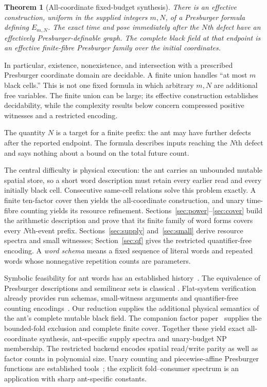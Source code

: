 \documentclass[11pt]{article}
\newtheorem{theorem}{Theorem}[section]
\theoremstyle{remark}\newtheorem{remark}[theorem]{Remark}
\begin{document}
\begin{theorem}[All-coordinate fixed-budget synthesis]\label{thm:main}
There is an effective construction, uniform in the supplied integers $m,N$,
of a Presburger formula defining $E_{m,N}$. The exact time and pose immediately
after the $N$th defect have an effectively Presburger-definable graph. The
complete black field at that endpoint is an effective finite-fibre Presburger
family over the initial coordinates.
\end{theorem}

In particular, existence, nonexistence, and intersection with a prescribed
Presburger coordinate domain are decidable. A finite union handles ``at most
$m$ black cells.'' This is not one fixed formula in which arbitrary $m,N$ are
additional free variables. The finite union can be large; its effective construction establishes
decidability, while the complexity results below concern compressed positive
witnesses and a restricted encoding.

The quantity $N$ is a target for a finite prefix: the ant may have further
defects after the reported endpoint. The formula describes inputs reaching
the $N$th defect and says nothing about a bound on the total future count.

The central difficulty is physical execution: the ant carries an unbounded
mutable spatial store, so a short word description must retain every earlier
read and every initially black cell. Consecutive same-cell relations solve
this problem exactly. A finite ten-factor cover then yields the all-coordinate
construction, and unary time-fibre counting yields its resource refinement.
Sections~\ref{sec:power}--\ref{sec:cover} build the arithmetic description
and prove that its finite family of word forms covers every $N$th-event
prefix. Sections~\ref{sec:supply} and~\ref{sec:small} derive resource spectra
and small witnesses; Section~\ref{sec:qf} gives the restricted quantifier-free
encoding. A \emph{word schema} means a fixed sequence of literal words and
repeated words whose nonnegative repetition counts are parameters.

Symbolic feasibility for ant words has an established history~\cite{gajardo}.
The equivalence of Presburger descriptions and semilinear sets is classical
\cite{ginsburg}. Flat-system verification already provides run schemas,
small-witness arguments and quantifier-free counting encodings~\cite{flat,demri}.
Our reduction supplies the additional physical semantics of the ant's complete
mutable black field. The companion factor paper~\cite{project} supplies the
bounded-fold exclusion and complete finite cover. Together these yield exact
all-coordinate synthesis, ant-specific supply spectra and unary-budget NP
membership. The restricted backend encodes spatial read/write parity as well
as factor counts in polynomial size. Unary counting and piecewise-affine
Presburger functions are established tools~\cite{counting,cluckers}; the
explicit fold--consumer spectrum is an application with sharp ant-specific
constants.
\end{document}
